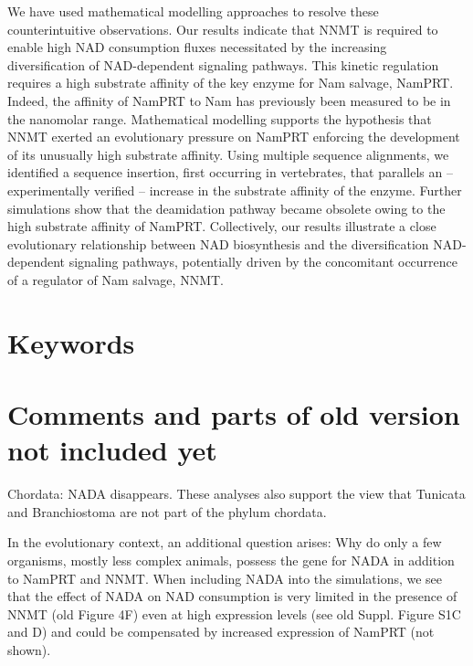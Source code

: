 \documentclass[paper=a4, 12pt]{scrartcl}
\begin{document}
We have used mathematical modelling approaches to resolve these counterintuitive observations. Our results indicate that NNMT is required to enable high NAD consumption fluxes necessitated by the increasing diversification of NAD-dependent signaling pathways. This kinetic regulation requires a high substrate affinity of the key enzyme for Nam salvage, NamPRT. Indeed, the affinity of NamPRT to Nam has previously been measured to be in the nanomolar range. Mathematical modelling supports the hypothesis that NNMT exerted an evolutionary pressure on NamPRT enforcing the development of its unusually high substrate affinity. Using multiple sequence alignments, we identified a sequence insertion, first occurring in vertebrates, that parallels an – experimentally verified – increase in the substrate affinity of the enzyme. Further simulations show that the deamidation pathway became obsolete owing to the high substrate affinity of NamPRT. Collectively, our results illustrate a close evolutionary relationship between NAD biosynthesis and the diversification NAD-dependent signaling pathways, potentially driven by the concomitant occurrence of a regulator of Nam salvage, NNMT.


\section{Keywords}











\section{Comments and parts of old version not included yet}

Chordata: NADA disappears. These analyses also support the view that Tunicata and Branchiostoma are not part of the phylum chordata.

In the evolutionary context, an additional question arises: Why do only a few organisms, mostly less complex animals, possess the gene for NADA in addition to NamPRT and NNMT. When including NADA into the simulations, we see that the effect of NADA on NAD consumption is very limited in the presence of NNMT (old Figure 4F) even at high expression levels (see old Suppl. Figure S1C and D) and could be compensated by increased expression of NamPRT (not shown).
\end{document}
